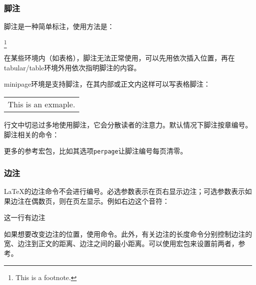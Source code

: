 \subsubsection{脚注}
脚注是一种简单标注，使用方法是：
\begin{latex}
\footnote{This is a footnote.}
\end{latex}

在某些环境内（如表格），脚注无法正常使用，可以先用依次插入位置，再在tabular/table环境外用依次指明脚注的内容。

minipage环境是支持脚注，在其内部或正文内这样可以写表格脚注：

\begin{codeshow}
\begin{minipage}{\linewidth}
\begin{tabular}{l}
This is an exmaple\footnotemark. 
\end{tabular}
\end{minipage}
\end{codeshow}

行文中切忌过多地使用脚注，它会分散读者的注意力。默认情况下脚注按章编号。脚注相关的命令：
\begin{latex}
\caption{Titel\protect\footnote{This is footnote.}}
\renewcommand\footnoterule{\rule{0.4\columnwidth}{0.4pt}}
\setlength{\skip\footins}{0.5cm}
\end{latex}

更多的参考宏包，比如其选项\texttt{perpage}让脚注编号每页清零。

\subsubsection{边注}
\LaTeX 的边注命令不会进行编号。必选参数表示在页右显示边注；可选参数表示如果边注在偶数页，则在页左显示。例如右边这个音符：\marginpar{\twonotes}
\begin{latex}
这一行有边注
\end{latex}

如果想要改变边注的位置，使用命令。此外，有关边注的长度命令分别控制边注的宽、边注到正文的距离、边注之间的最小距离。可以使用宏包来设置前两者，参考。

